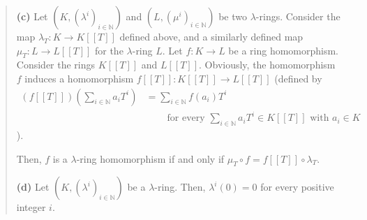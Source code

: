 \documentclass[numbers=enddot,12pt,final,onecolumn,notitlepage]{scrartcl}%
\begin{document}
\begin{quote}
\textbf{(c)} Let $\left(  K,\left(  \lambda^{i}\right)  _{i\in\mathbb{N}%
}\right)  $ and $\left(  L,\left(  \mu^{i}\right)  _{i\in\mathbb{N}}\right)  $
be two $\lambda$-rings. Consider the map $\lambda_{T}:K\rightarrow K\left[
\left[  T\right]  \right]  $ defined above, and a similarly defined map
$\mu_{T}:L\rightarrow L\left[  \left[  T\right]  \right]  $ for the $\lambda
$-ring $L$. Let $f:K\rightarrow L$ be a ring homomorphism. Consider the rings
$K\left[  \left[  T\right]  \right]  $ and $L\left[  \left[  T\right]
\right]  $. Obviously, the homomorphism $f$ induces a homomorphism $f\left[
\left[  T\right]  \right]  :K\left[  \left[  T\right]  \right]  \rightarrow
L\left[  \left[  T\right]  \right]  $ (defined by
\begin{align*}
\left(  f\left[  \left[  T\right]  \right]  \right)  \left(  \sum
\limits_{i\in\mathbb{N}}a_{i}T^{i}\right)   &  =\sum\limits_{i\in\mathbb{N}%
}f\left(  a_{i}\right)  T^{i}\\
&  \ \ \ \ \ \ \ \ \ \ \text{for every }\sum\limits_{i\in\mathbb{N}}a_{i}%
T^{i}\in K\left[  \left[  T\right]  \right]  \text{ with }a_{i}\in K
\end{align*}
).

Then, $f$ is a $\lambda$-ring homomorphism if and only if $\mu_{T}\circ
f=f\left[  \left[  T\right]  \right]  \circ\lambda_{T}$.

\textbf{(d)} Let $\left(  K,\left(  \lambda^{i}\right)  _{i\in\mathbb{N}%
}\right)  $ be a $\lambda$-ring. Then, $\lambda^{i}\left(  0\right)  =0$ for
every positive integer $i$.
\end{quote}
\end{document}
